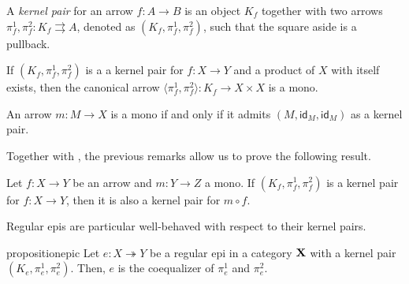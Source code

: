 \documentclass[a4paper,UKenglish,cleveref,pdftex,thm-restate,numberwithinsect]{lipics-v2021}
\def\X{\textbf {\textup{X}}}
\newcommand{\eto}{\twoheadrightarrow}
\newcommand{\id}[1]{\mathsf{id}_{#1}}
\begin{document}
\noindent 
\parbox{11cm}{
\begin{definition}
    A \emph{kernel pair} for an arrow $f\colon A \to B$ is an object $K_f$ together with two arrows $\pi^1_f, \pi^2_f\colon K_f \rightrightarrows A$, denoted as $(K_f, \pi^1_f, \pi^2_f)$, such that the square aside is a pullback.
\end{definition}}\hfill 
\parbox{2cm}{}

\smallskip
\begin{remark}\label{prop:pairng_of_kernel_pairs_mono}
If $(K_f, \pi^1_f, \pi^2_f)$ is a a kernel pair for $f\colon X \to Y$ and a product of $X$ with itself exists, then the canonical arrow $\langle \pi^1_f, \pi^2_f\rangle \colon K_f \to X \times X$ is a mono.
\end{remark}

\begin{remark}\label{prop:kermono}
An arrow $m\colon M\to X$ is a mono if and only if it admits $(M, \id{M}, \id{M})$ as a kernel pair.
\end{remark}

Together with , the previous remarks allow us to prove the following result.

\begin{proposition}\label{cor:kermono}
	Let $f\colon X\to Y$ be an arrow and $m\colon Y\to Z$ a mono. If
	$(K_f, \pi_f^1, \pi_f^2)$ is a kernel pair for $f\colon X\to Y$, then it is also a kernel pair for $m\circ f$.
\end{proposition}

Regular epis are particular well-behaved with respect to their kernel pairs.

\begin{restatable}{proposition}{epic}\label{prop:reg_epi_coeq}
    Let $e\colon X \eto Y$ be a regular epi in a category $\X$ with a kernel pair $(K_e, \pi^1_e, \pi^2_e)$. Then, $e$ is the coequalizer of $\pi^1_e$ and $\pi^2_e$.
\end{restatable}
\end{document}
